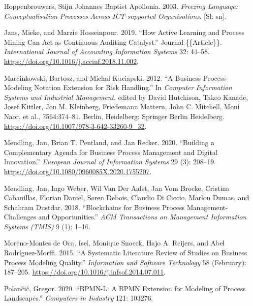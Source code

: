 \documentclass[
  letterpaper,
  DIV=11,
  numbers=noendperiod]{scrreprt}
\newlength{\cslhangindent}
\newlength{\cslentryspacingunit} %
\newenvironment{CSLReferences}[2] %
 {%
  \setlength{\parindent}{0pt}
  \ifodd #1
  \let\oldpar\par
  \def\par{\hangindent=\cslhangindent\oldpar}
  \fi
  \setlength{\parskip}{#2\cslentryspacingunit}
 }%
 {}
\begin{document}
\begin{CSLReferences}{1}{0}
\leavevmode{}%
Hoppenbrouwers, Stijn Johannes Baptist Apollonia. 2003. \emph{Freezing
Language: Conceptualisation Processes Across {ICT-supported}
Organisations}. {{[}Sl: sn{]}}.

\leavevmode{}%
Jans, Mieke, and Marzie Hosseinpour. 2019. {``How Active Learning and
Process Mining Can Act as {Continuous Auditing} Catalyst.''} Journal
\{\{Article\}\}. \emph{International Journal of Accounting Information
Systems} 32: 44--58. \url{https://doi.org/10.1016/j.accinf.2018.11.002}.

\leavevmode{}%
Marcinkowski, Bartosz, and Michal Kuciapski. 2012. {``A {Business
Process Modeling Notation Extension} for {Risk Handling}.''} In
\emph{Computer {Information Systems} and {Industrial Management}},
edited by David Hutchison, Takeo Kanade, Josef Kittler, Jon M.
Kleinberg, Friedemann Mattern, John C. Mitchell, Moni Naor, et al.,
7564:374--81. {Berlin, Heidelberg}: {Springer Berlin Heidelberg}.
\url{https://doi.org/10.1007/978-3-642-33260-9_32}.

\leavevmode{}%
Mendling, Jan, Brian T. Pentland, and Jan Recker. 2020. {``Building a
Complementary Agenda for Business Process Management and Digital
Innovation.''} \emph{European Journal of Information Systems} 29 (3):
208--19. \url{https://doi.org/10.1080/0960085X.2020.1755207}.

\leavevmode{}%
Mendling, Jan, Ingo Weber, Wil Van Der Aalst, Jan Vom Brocke, Cristina
Cabanillas, Florian Daniel, Søren Debois, Claudio Di Ciccio, Marlon
Dumas, and Schahram Dustdar. 2018. {``Blockchains for Business Process
Management-Challenges and Opportunities.''} \emph{ACM Transactions on
Management Information Systems (TMIS)} 9 (1): 1--16.

\leavevmode{}%
Moreno-Montes de Oca, Isel, Monique Snoeck, Hajo A. Reijers, and Abel
Rodríguez-Morffi. 2015. {``A Systematic Literature Review of Studies on
Business Process Modeling Quality.''} \emph{Information and Software
Technology} 58 (February): 187--205.
\url{https://doi.org/10.1016/j.infsof.2014.07.011}.

\leavevmode{}%
Polančič, Gregor. 2020. {``{BPMN-L}: {A BPMN} Extension for Modeling of
Process Landscapes.''} \emph{Computers in Industry} 121: 103276.


\end{CSLReferences}
\end{document}
